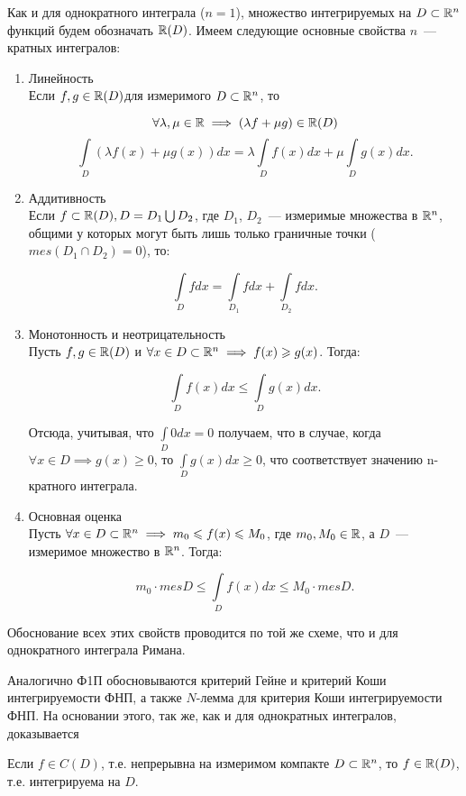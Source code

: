 \documentclass[../../main.tex]{subfiles}
\begin{document}
Как и для однократного интеграла ($n = 1$), множество интегрируемых на 
$D \subset \mathbb{R}^n$ функций будем обозначать
$\mathbb{R}(D)$. Имеем следующие основные свойства $n$~--- кратных интегралов:
\begin{enumerate}
	\item Линейность\\
	Если $f, g \in \mathbb{R}(D)$для измеримого $D \subset \mathbb{R}^n$, то
	
	\[
			\forall \lambda, \mu \in \mathbb{R} \implies (\lambda f + \mu g) \in \mathbb{R}(D)
	\]
	\[
			\int\limits_D (\lambda f(x) + \mu g(x))dx = \lambda \int\limits_D f(x)dx +
			\mu \int\limits_D g(x)dx.
	\]
	
	\item Аддитивность\\
	Если $f \subset \mathbb{R}(D), D = D_1 \bigcup D_2$, 
	где $D_1$, $D_2$~--- измеримые множества в $\mathbb{R}^n$,
	общими у которых могут быть лишь только граничные точки 
	(${ mes(D_1 \cap D_2) = 0 }$), то:
	
	\[
		\int\limits_{D}fdx = \int\limits_{D_1}fdx + \int\limits_{D_2}fdx.
	\]
		
	\item Монотонность и неотрицательность\\
	Пусть $f, g \in \mathbb{R}(D)$ и 
	$\forall x \in D \subset \mathbb{R}^n \implies f(x) \geqslant g(x)$. Тогда:
	
	\[
	\int\limits_Df(x)dx \le \int\limits_Dg(x)dx.
	\]
	
	Отсюда, учитывая, что $\int\limits_D0dx=0$ получаем, что в случае, когда 
	$\forall x \in D \implies g(x) \ge 0$, то $\int\limits_Dg(x)dx \ge 0$, 
	что соответствует значению n-кратного интеграла.
	
	\item Основная оценка\\
	Пусть $\forall x \in D \subset \mathbb{R}^n \implies m_0 \leqslant f(x) \leqslant M_0$, где
	$m_0, M_0 \in \mathbb{R}$, а $D$~--- измеримое множество в $\mathbb{R}^n$. Тогда:
	
	\[
		m_0 \cdot mesD \le \int\limits_D f(x) dx \le M_0 \cdot mesD.
	\]
\end{enumerate}


Обоснование всех этих свойств проводится по той же схеме, 
что и для однократного интеграла Римана.

Аналогично Ф1П обосновываются критерий Гейне 
и критерий Коши интегрируемости ФНП,
а также $N$-лемма для критерия Коши интегрируемости ФНП. 
На основании этого, так же, как и для
однократных интегралов, доказывается
\begin{thm}
	Если $f \in C(D)$, т.е. непрерывна на измеримом компакте
	 $D \subset \mathbb{R}^n$, то $f \in \mathbb{R}(D)$,
	т.е. интегрируема на $D$.
\end{thm}
\end{document}
